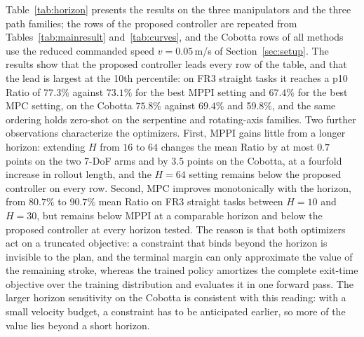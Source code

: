 \documentclass[journal, twoside]{IEEEtran}
\begin{document}
Table~\ref{tab:horizon} presents the results on the three manipulators
and the three path families; the rows of the proposed controller are
repeated from Tables~\ref{tab:mainresult} and~\ref{tab:curves}, and the Cobotta rows of all
methods use the reduced commanded speed $v=0.05$\,m/s of
Section~\ref{sec:setup}. The
results show that the proposed controller leads every row of the table,
and that the lead is largest at the 10th percentile: on FR3 straight
tasks it reaches a p10 Ratio of $77.3\%$ against $73.1\%$ for the best
MPPI setting and $67.4\%$ for the best MPC setting, on the Cobotta
$75.8\%$ against $69.4\%$ and 59.8$\%$, and the same
ordering holds zero-shot on the serpentine and rotating-axis families.
Two further observations characterize the optimizers. First, MPPI gains
little from a longer horizon: extending $H$ from $16$ to $64$ changes
the mean Ratio by at most $0.7$ points on the two 7-DoF arms and by
$3.5$ points on the Cobotta, at a fourfold increase in rollout length, and the
$H=64$ setting remains below the proposed controller on every row.
Second, MPC improves monotonically with the horizon, from $80.7\%$ to
$90.7\%$ mean Ratio on FR3 straight tasks between $H=10$ and $H=30$,
but remains below MPPI at a comparable horizon and below the proposed
controller at every horizon tested. The reason is that both optimizers
act on a truncated objective: a constraint that binds beyond the
horizon is invisible to the plan, and the terminal margin can only
approximate the value of the remaining stroke, whereas the trained
policy amortizes the complete exit-time objective over the training
distribution and evaluates it in one forward pass. The larger horizon
sensitivity on the Cobotta is consistent with this reading: with a small
velocity budget, a constraint has to be anticipated earlier, so more of
the value lies beyond a short horizon.
\end{document}
